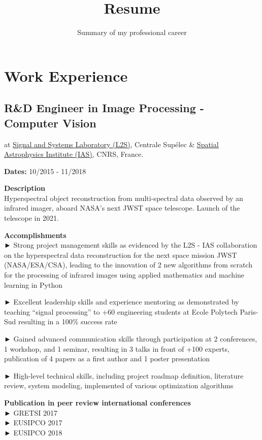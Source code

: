 \documentclass[
]{article}
\title{Resume}
\subtitle{Summary of my professional career}
\date{}
\begin{document}
\maketitle

\hypertarget{work-experience}{%
\section{Work Experience}\label{work-experience}}

\hypertarget{rd-engineer-in-image-processing---computer-vision}{%
\subsection{R\&D Engineer in Image Processing - Computer
Vision}\label{rd-engineer-in-image-processing---computer-vision}}

at \href{http://www.l2s.centralesupelec.fr/}{Signal and Systems
Laboratory (L2S)}, Centrale Supélec \&
\href{http://www.ias.u-psud.fr/}{Spatial Astrophysics Institute (IAS)},
CNRS, France.

\textbf{Dates:} 10/2015 - 11/2018

\textbf{Description}\\
Hyperspectral object reconstruction from multi-spectral data observed by
an infrared imager, aboard NASA's next JWST space telescope. Launch of
the telescope in 2021.

\textbf{Accomplishments}\\
► Strong project management skills as evidenced by the L2S - IAS
collaboration on the hyperspectral data reconstruction for the next
space mission JWST (NASA/ESA/CSA), leading to the innovation of 2 new
algorithms from scratch for the processing of infrared images using
applied mathematics and machine learning in Python

► Excellent leadership skills and experience mentoring as demonstrated
by teaching ``signal processing'' to +60 engineering students at Ecole
Polytech Paris-Sud resulting in a 100\% success rate

► Gained advanced communication skills through participation at 2
conferences, 1 workshop, and 1 seminar, resulting in 3 talks in front of
+100 experts, publication of 4 papers as a first author and 1 poster
presentation

► High-level technical skills, including project roadmap definition,
literature review, system modeling, implemented of various optimization
algorithms

\textbf{Publication in peer review international conferences}\\
► GRETSI 2017\\
► EUSIPCO 2017\\
► EUSIPCO 2018
\end{document}
